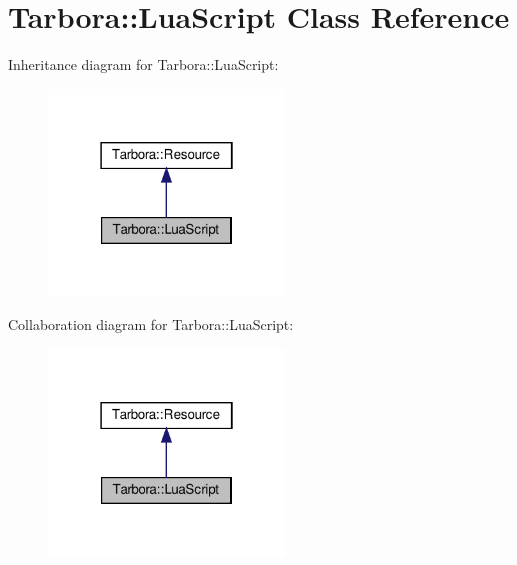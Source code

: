 \hypertarget{classTarbora_1_1LuaScript}{}\section{Tarbora\+:\+:Lua\+Script Class Reference}
\label{classTarbora_1_1LuaScript}


Inheritance diagram for Tarbora\+:\+:Lua\+Script\+:
\nopagebreak
\begin{figure}[H]
\begin{center}
\leavevmode
\includegraphics[width=178pt]{classTarbora_1_1LuaScript__inherit__graph}
\end{center}
\end{figure}


Collaboration diagram for Tarbora\+:\+:Lua\+Script\+:
\nopagebreak
\begin{figure}[H]
\begin{center}
\leavevmode
\includegraphics[width=178pt]{classTarbora_1_1LuaScript__coll__graph}
\end{center}
\end{figure}
